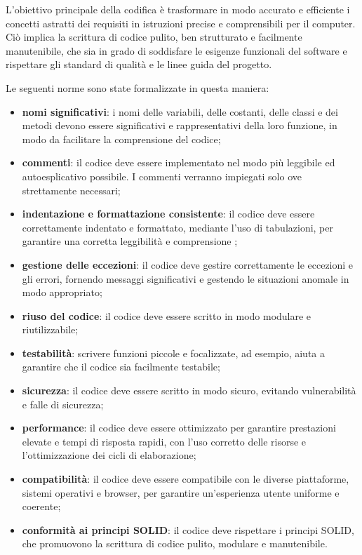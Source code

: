 L'obiettivo principale della codifica è trasformare in modo accurato e efficiente i concetti astratti dei requisiti in istruzioni precise e comprensibili per il computer. Ciò implica la scrittura di codice pulito, ben strutturato e facilmente manutenibile, che sia in grado di soddisfare le esigenze funzionali del software e rispettare gli standard di qualità e le linee guida del progetto.

Le seguenti norme sono state formalizzate in questa maniera:
\begin{itemize}
	\item \textbf{nomi significativi}: i nomi delle variabili, delle costanti, delle classi e dei metodi devono essere significativi e rappresentativi della loro funzione, in modo da facilitare la comprensione del codice;
	\item \textbf{commenti}: il codice deve essere implementato nel modo più leggibile ed autoesplicativo possibile. I commenti verranno impiegati solo ove strettamente necessari;
	\item \textbf{indentazione e formattazione consistente}: il codice deve essere correttamente indentato e formattato, mediante l'uso di tabulazioni, per garantire una corretta leggibilità e comprensione ;
	\item \textbf{gestione delle eccezioni}: il codice deve gestire correttamente le eccezioni e gli errori, fornendo messaggi significativi e gestendo le situazioni anomale in modo appropriato;
	\item \textbf{riuso del codice}: il codice deve essere scritto in modo modulare e riutilizzabile;
	\item \textbf{testabilità}: scrivere funzioni piccole e focalizzate, ad esempio, aiuta a garantire che il codice sia facilmente testabile;
	\item \textbf{sicurezza}: il codice deve essere scritto in modo sicuro, evitando vulnerabilità e falle di sicurezza;
	\item \textbf{performance}: il codice deve essere ottimizzato per garantire prestazioni elevate e tempi di risposta rapidi, con l'uso corretto delle risorse e l'ottimizzazione dei cicli di elaborazione;
	\item \textbf{compatibilità}: il codice deve essere compatibile con le diverse piattaforme, sistemi operativi e browser, per garantire un'esperienza utente uniforme e coerente;
	\item \textbf{conformità ai principi SOLID}: il codice deve rispettare i principi SOLID, che promuovono la scrittura di codice pulito, modulare e manutenibile.
\end{itemize}


